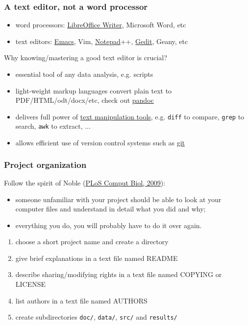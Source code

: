 \documentclass[c]{beamer} %
\begin{document}
\begin{frame}[fragile]
  \frametitle{A text editor, not a word processor}
  \begin{itemize}
  \item word processors: \href{https://www.libreoffice.org/discover/writer/}{LibreOffice Writer}, Microsoft Word, etc
  \item text editors: \href{https://www.gnu.org/software/emacs/}{Emacs}, Vim, \href{https://notepad-plus-plus.org/}{Notepad}++, \href{https://wiki.gnome.org/Apps/Gedit}{Gedit}, Geany, etc
  \end{itemize}
  
  \bigskip
  \pause
  
  Why \alert{knowing/mastering a good text editor is crucial}?
  \begin{itemize}
  \item essential tool of any data analysis, e.g. scripts
  \item light-weight markup languages convert plain text to PDF/HTML/odt/docx/etc, check out \href{http://johnmacfarlane.net/pandoc/}{pandoc}
  \item delivers full power of \href{http://www.ibm.com/developerworks/aix/library/au-unixtext/index.html}{text manipulation tools}, e.g. \verb+diff+ to compare, \verb+grep+ to search, \verb+awk+ to extract, ...
  \item allows efficient use of version control systems such as \href{http://www.git-scm.com/}{git}
  \end{itemize}
\end{frame}

\begin{frame}[fragile]
  \frametitle{Project organization}
  Follow the spirit of Noble (\href{http://dx.doi.org/10.1371/journal.pcbi.1000424}{PLoS Comput Biol, 2009}):
  \begin{itemize}
  \item someone unfamiliar with your project should be able to look at your computer files and understand in detail what you did and why;
  \item everything you do, you will probably have to do it over again.
  \end{itemize}
  
  \bigskip
  \pause
  
  \begin{enumerate}
  \item choose a short project name and create a directory
  \item give brief explanations in a text file named README
  \item describe sharing/modifying rights in a text file named COPYING or LICENSE
  \item list authors in a text file named AUTHORS
  \item create subdirectories \verb+doc/+, \verb+data/+, \verb+src/+ and \verb+results/+
  \end{enumerate}
\end{frame}
\end{document}
